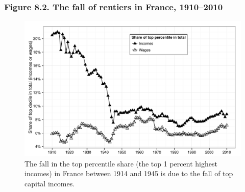 \documentclass[t]{beamer}\usepackage[]{graphicx}\usepackage[]{color}
\newenvironment{knitrout}{}{} %
\begin{document}
\begin{frame}[label=Figure_8_2,fragile]
\frametitle{Figure 8.2. The fall of rentiers in France, 1910--2010}
\begin{figure}[t]
\begin{minipage}[b]{\textwidth}
\centering
\begin{knitrout}\footnotesize
{}\color{fgcolor}

{\centering \includegraphics[width=1\linewidth]{figures/bw/Figure_8_2} 

}



\end{knitrout}
\caption{The fall in the top percentile share (the top 1 percent highest incomes) in France between 1914 and 1945 is due to the fall of top capital incomes.}
\end{minipage}
\end{figure}
\end{frame}
\end{document}
